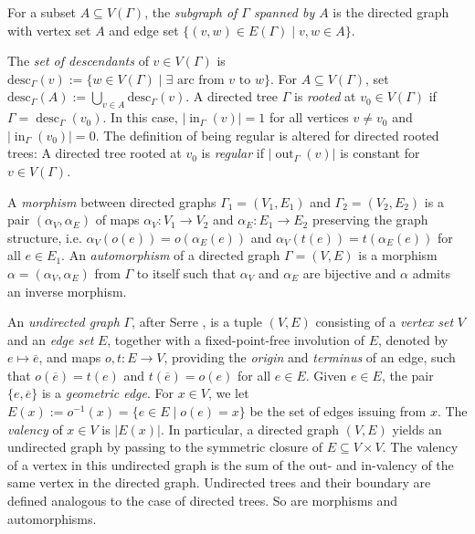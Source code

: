 \documentclass{article}
\DeclareMathOperator\out{out}
\DeclareMathOperator\desc{desc}
\theoremstyle{definition}
\begin{document}
For a subset $A\subseteq V(\Gamma)$, the \emph{subgraph of $\Gamma$ spanned by $A$} is the directed graph with vertex set $A$ and edge set $\{(v,w)\in E(\Gamma)\mid v,w\in A\}$.

The \emph{set of descendants} of $v\!\in\! V(\Gamma)$ is $\mathrm{desc}_{\Gamma}(v)\!:=\!\{w\!\in\! V(\Gamma)\!\mid\!\exists\text{ arc from $v$ to $w$}\}$. For $A\subseteq V(\Gamma)$, set $\mathrm{desc}_{\Gamma}(A):=\bigcup_{v\in A}\mathrm{desc}_{\Gamma}(v)$. A directed tree $\Gamma$ is \emph{rooted} at $v_0\in V(\Gamma)$ if $\Gamma = \desc_{\Gamma}(v_0)$. In this case, $|\operatorname{in}_{\Gamma}(v)| = 1$ for all vertices $v\neq v_0$ and $|\operatorname{in}_{\Gamma}(v_0)|= 0$. The definition of being regular is altered for directed rooted trees: A directed tree rooted at $v_0$ is \emph{regular} if $|\out_\Gamma(v)|$ is constant for $v\in V(\Gamma)$.

A \emph{morphism} between directed graphs $\Gamma_{1}=(V_{1},E_{1})$ and $\Gamma_{2}=(V_{2},E_{2})$ is a pair $(\alpha_{V},\alpha_{E})$ of maps $\alpha_{V}:V_{1}\to V_{2}$ and $\alpha_{E}:E_{1}\to E_{2}$ preserving the graph structure, i.e. $\alpha_{V}(o(e))=o(\alpha_{E}(e))$ and $\alpha_{V}(t(e))=t(\alpha_{E}(e))$ for all $e\in E_{1}$. An \emph{automorphism} of a directed graph $\Gamma=(V,E)$ is a morphism $\alpha=(\alpha_{V},\alpha_{E})$ from $\Gamma$ to itself such that $\alpha_{V}$ and $\alpha_{E}$ are bijective and $\alpha$ admits an inverse morphism.

\vspace{0.2cm}
An \emph{undirected graph} $\Gamma$, after Serre \cite{Ser03}, is a tuple $(V,E)$ consisting of a \emph{vertex set} $V$ and an \emph{edge set} $E$, together with a fixed-point-free involution of $E$, denoted by $e\mapsto\overline{e}$, and maps $o,t:E\to V$, providing the \emph{origin} and \emph{terminus} of an edge, such that $o(\overline{e})=t(e)$ and $t(\overline{e})=o(e)$ for all $e\in E$. Given $e\in E$, the pair $\{e,\overline{e}\}$ is a \emph{geometric edge}. For $x\in V$, we let $E(x):=o^{-1}(x)=\{e\in E\mid o(e)=x\}$ be the set of edges issuing from $x$. The \emph{valency} of $x\in V$ is $|E(x)|$. In particular, a directed graph $(V,E)$ yields an undirected graph by passing to the symmetric closure of $E\subseteq V\times V$. The valency of a vertex in this undirected graph is the sum of the out- and in-valency of the same vertex in the directed graph. Undirected trees and their boundary are defined analogous to the case of directed trees. So are morphisms and automorphisms.
\end{document}
